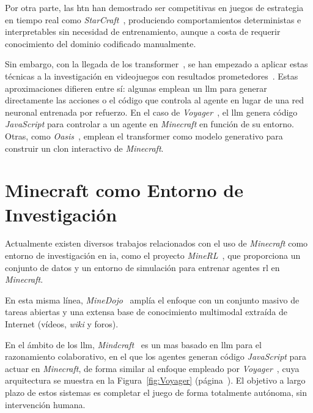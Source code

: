 Por otra parte, las \gls{htn} han demostrado ser competitivas
en juegos de estrategia en tiempo real como \textit{StarCraft}~\cite{DBLP:conf/ijcai/OntanonB15},
produciendo comportamientos deterministas e interpretables sin necesidad de
entrenamiento, aunque a costa de requerir conocimiento del dominio codificado
manualmente.

Sin embargo, con la llegada de los \gls{transformer}~\cite{DBLP:conf/nips/VaswaniSPUJGKP17}, 
se han empezado a aplicar estas técnicas a la investigación en videojuegos con resultados 
prometedores~\cite{DBLP:conf/nips/BakerAZHTEHSC22, DBLP:journals/corr/abs-2305-16291, DBLP:conf/nips/FanWJMYZTHZA22, oasis2024}. 
Estas aproximaciones difieren entre sí: algunas emplean un \gls{llm} para generar directamente las acciones o el código que controla al agente 
en lugar de una red neuronal entrenada por refuerzo. 
En el caso de \textit{Voyager}~\cite{DBLP:journals/corr/abs-2305-16291}, el \gls{llm} genera código \textit{JavaScript}
para controlar a un agente en \textit{Minecraft} en función de su entorno. Otras, como \textit{Oasis}~\cite{oasis2024},
emplean el \gls{transformer} como modelo generativo para construir un clon interactivo de \textit{Minecraft}.

\section{Minecraft como Entorno de Investigación}
Actualmente existen diversos trabajos relacionados con el uso de \textit{Minecraft} como
entorno de investigación en \gls{ia},
como el proyecto \textit{MineRL}~\cite{guss2019minerl}, que proporciona un conjunto de datos y un
entorno de simulación para entrenar agentes \gls{rl} en \textit{Minecraft}.

En esta misma línea, \textit{MineDojo}~\cite{DBLP:conf/nips/FanWJMYZTHZA22} amplía el enfoque con un
conjunto masivo de tareas abiertas y una extensa base de conocimiento multimodal extraída de Internet (vídeos, \textit{wiki} y foros).

En el ámbito de los \gls{llm}, \textit{Mindcraft}~\cite{mindcraft2025} es un \gls{mas} basado en \gls{llm} para el razonamiento colaborativo,
en el que los agentes generan código \textit{JavaScript} para actuar en \textit{Minecraft}, de forma similar al enfoque empleado por
\textit{Voyager}~\cite{DBLP:journals/corr/abs-2305-16291}, cuya arquitectura se muestra en la Figura~\ref{fig:Voyager} (página~\pageref{fig:Voyager}).
El objetivo a largo plazo de estos sistemas es completar el juego de forma totalmente autónoma, sin intervención humana.

